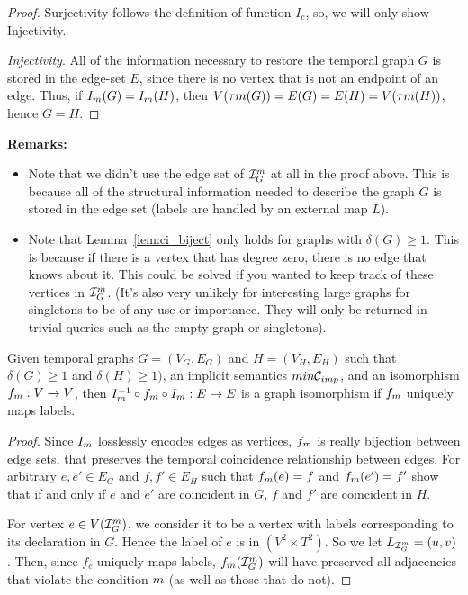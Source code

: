\begin{proof}[Proof] Surjectivity follows the definition of function $I_c$, so,
  we will only show Injectivity.
  
  \textit{Injectivity}. All of the information necessary to restore the temporal
  graph $G$ is stored in the edge-set $E$, since there is no vertex that is not
  an endpoint of an edge. Thus, if $I_{m}(G) = I_{m}(H)$,
  then $V(\tau{m}(G)) = E(G) = E(H) = V(\tau{m}(H))$, hence
  $G = H$.
\end{proof}

\noindent \textbf{Remarks:}
\begin{itemize}
  \item Note that we didn't use the edge set of $\mathcal{I}_{G}^{m}$ at all in
    the proof above. This is because all of the structural information needed to
    describe the graph $G$ is stored in the edge set (labels are handled by an
    external map $L$).
  \item Note that Lemma~\ref{lem:ci_biject} only holds for graphs with
    $\delta(G) \geq 1$. This is because if there is a vertex that has degree
    zero, there is no edge that knows about it. This could be solved if you
    wanted to keep track of these vertices in $\mathcal{I}_{G}^{m}$. (It's also
    very unlikely for interesting large graphs for singletons to be of any use
    or importance. They will only be returned in trivial queries such as the
    empty graph or singletons).
\end{itemize}

\begin{corollary}
  Given temporal graphs $G = (V_G, E_G)$ and $H = (V_H, E_H)$ such that
  $\delta(G) \geq 1$ and $\delta(H) \geq 1)$, an implicit semantics $m in
  \mathcal{C}_{imp}$, and an isomorphism $f_m : V \to V$, then $I_{m}^{-1}
  \circ f_{m} \circ I_{m} : E \to E$ is a graph isomorphism if
  $f_{m}$ uniquely maps labels.
\end{corollary}

\begin{proof}
  Since $I_{m}$ losslessly encodes edges as vertices, $f_{m}$
  is really bijection between edge sets, that preserves the temporal coincidence
  relationship between edges.  For arbitrary $e,e' \in E_G$ and $f,f'\in E_H$
  such that $f_{m}(e) = f$ and $f_{m}(e') = f'$ show that if and
  only if $e$ and $e'$ are coincident in $G$, $f$ and $f'$ are coincident in
  $H$.

  For vertex $e \in V(\mathcal{I}_{G}^{m})$, we consider it to be a vertex with
  labels corresponding to its declaration in $G$. Hence the label of $e$ is in
  $(V^2 \times T^2)$. So we let $L_{\mathcal{I}_{G}^{m}} = \left(u, v
  \right)$. Then, since $f_c$ uniquely maps labels,
  $f_{m}(\mathcal{I}_{G}^{m})$ will have preserved all adjacencies that
  violate the condition $m$ (as well as those that do not).
\end{proof}

